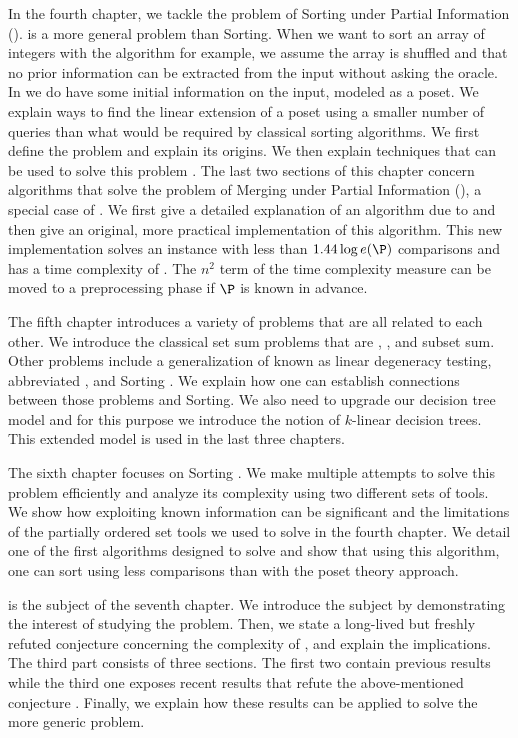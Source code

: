 In the fourth chapter, we tackle the problem of Sorting under Partial
Information (\SUPI). \SUPI is
a more general problem than Sorting. When we want to sort an array of integers
with the \quicksort algorithm for example, we assume the array is shuffled and
that no prior information can be extracted from the input without asking the
oracle. In \SUPI we do have some initial information on the input, modeled as a
poset. We explain ways
to find the linear extension of a poset using a smaller number of queries than
what would be required by classical sorting algorithms. We first define
the problem and explain its origins. We then explain techniques that can
be used to solve this problem \cite{kahn:1995,cardinal:2013}. The
last two sections of this chapter concern
algorithms that solve the problem of Merging under Partial Information
(\MUPI), a special case of \SUPI. We first
give a detailed explanation of an algorithm due to \citet*{linial:1984} and
then give an original, more practical implementation of this algorithm. This
new implementation solves an \MUPI instance with less than \(1.44 \log e(\P)\)
comparisons and has a time complexity of . The
\(n^2\) term of the time complexity measure can be moved to a preprocessing
phase if \(\P\) is known in advance.

The fifth chapter introduces a variety of problems that are all related to
each other. We introduce the classical set sum problems that are
\threeSUM, \kSUM, and subset sum. Other problems include a generalization of
\kSUM known as linear degeneracy testing, abbreviated \kLDT, and Sorting \XY.
We explain how one can establish connections between those problems and
Sorting. We also need to upgrade our decision tree model and for this
purpose we introduce the notion of \(k\)-linear decision trees. This
extended model is used in the last three chapters.

The sixth chapter focuses on Sorting \XY. We make
multiple attempts to solve this problem efficiently and analyze its complexity
using two different sets of tools. We show how exploiting known information
can be significant and the limitations of the partially ordered set tools
we used to solve \SUPI in the fourth chapter. We
detail one of the first algorithms designed to solve \SUPI
\cite{fredman:1976} and
show that using this algorithm, one can sort \XY
using less comparisons than with the poset theory approach.

\threeSUM is the subject of the seventh chapter. We introduce the
subject by demonstrating the interest of studying the \threeSUM problem. Then,
we state a long-lived but freshly refuted conjecture concerning the
complexity of \threeSUM, and explain the implications. The third part
consists of three sections. The first two contain previous results
\cite{erickson:1999,ailon:2005} while
the third one exposes recent results that refute the above-mentioned
conjecture \cite{gronlund:2014}. Finally, we explain how these results can be applied to solve
the more generic \kLDT problem.

